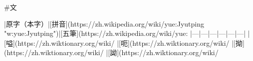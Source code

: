 


#文 

|原字（本字）|[拼音](https://zh.wikipedia.org/wiki/yue:Jyutping "w:yue:Jyutping")|[五筆](https://zh.wikipedia.org/wiki/yue:%
|---|---|---|---|---|---|
|[嗌](https://zh.wiktionary.org/wiki/%
|[呃](https://zh.wiktionary.org/wiki/%
|[拗](https://zh.wiktionary.org/wiki/%
|[詏](https://zh.wiktionary.org/wiki/%
